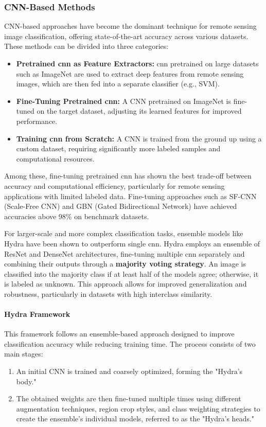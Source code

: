 \subsubsection{CNN-Based Methods}
CNN-based approaches have become the dominant technique for remote sensing image classification, offering 
state-of-the-art accuracy across various datasets. These methods can be divided into three categories:

\begin{itemize}
    \item \textbf{Pretrained \gls{cnn} as Feature Extractors:} \gls{cnn} pretrained on large datasets such as ImageNet are used to extract 
    deep features from remote sensing images, which are then fed into a separate classifier (e.g., SVM).
    \item \textbf{Fine-Tuning Pretrained \gls{cnn}:} A CNN pretrained on ImageNet is fine-tuned on the target dataset, adjusting its 
    learned features for improved performance.
    \item \textbf{Training \gls{cnn} from Scratch:} A CNN is trained from the ground up using a custom dataset, requiring 
    significantly more labeled samples and computational resources.
\end{itemize}

Among these, fine-tuning pretrained \gls{cnn} has shown the best trade-off between accuracy and computational efficiency, 
particularly for remote sensing applications with limited labeled data. Fine-tuning approaches such as SF-CNN 
(Scale-Free CNN) \cite{SF-CNN} and GBN (Gated Bidirectional Network) \cite{GBN} have achieved accuracies above 98\% 
on benchmark datasets.

For larger-scale and more complex classification tasks, ensemble models like Hydra \cite{hydra} have been
shown to outperform single \gls{cnn}. Hydra employs an ensemble of ResNet and DenseNet architectures,
fine-tuning multiple \gls{cnn} separately and combining their outputs through a \textbf{majority voting strategy}.
An image is classified into the majority class if at least half of the models agree; otherwise, it is labeled as unknown.
This approach allows for improved 
generalization and robustness, particularly in datasets with high interclass similarity.

\paragraph{Hydra Framework}
This framework follows an ensemble-based approach designed to improve classification accuracy while reducing training time. 
The process consists of two main stages:
\begin{enumerate}
    \item An initial CNN is trained and coarsely optimized, forming the "Hydra's body."
    \item The obtained weights are then fine-tuned multiple times using different augmentation techniques, region crop styles, 
    and class weighting strategies to create the ensemble’s individual models, referred to as the "Hydra's heads."
\end{enumerate}

